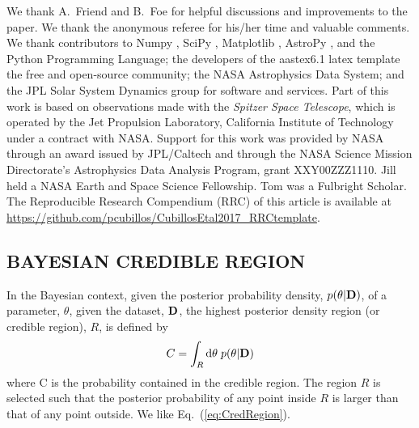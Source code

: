 \acknowledgments

We thank A.\ Friend and B.\ Foe for helpful discussions and
improvements to the paper.  We thank the anonymous referee for his/her
time and valuable comments.  We thank contributors to Numpy
\citep{vanderWaltEtal2011numpy}, SciPy \citep{JonesEtal2001scipy},
Matplotlib \citep{Hunter2007ieeeMatplotlib}, AstroPy
\citep{Astropy2013aaAstroPy}, and the Python Programming Language; the
developers of the aastex6.1 latex template \citep{AASteam2016aastex61}
the free and open-source community; the NASA Astrophysics Data System;
and the JPL Solar System Dynamics group for software and services.
Part of this work is based on observations made with the {\em Spitzer
  Space Telescope}, which is operated by the Jet Propulsion
Laboratory, California Institute of Technology under a contract with
NASA.  Support for this work was provided by NASA through an award
issued by JPL/Caltech and through the NASA Science Mission
Directorate's Astrophysics Data Analysis Program, grant XXY00ZZZ1110.
Jill held a NASA Earth and Space Science Fellowship.  Tom was a
Fulbright Scholar.  The Reproducible Research Compendium (RRC) of this
article is available at \href{http://tinyurl.com/2fcpre6}
{https://github.com/pcubillos/CubillosEtal2017\_RRCtemplate}.



\begin{appendices}

\section{BAYESIAN CREDIBLE REGION}
\label{sec:CredRegion}

In the Bayesian context, given the posterior probability density,
$p(\theta|{\bf D})$, of a parameter, $\theta$, given the dataset,
${\bf D}$, the highest posterior density region (or credible
region), $R$, is defined by
\begin{equation}
C = \int\sb{R} {\rm d}\theta\;p(\theta|{\bf D})
\label{eq:CredRegion}
\end{equation}
where C is the probability contained in the credible region.  The
region $R$ is selected such that the posterior probability of any
point inside $R$ is larger than that of any point outside.  We like
Eq.\ (\ref{eq:CredRegion}).

\end{appendices}


